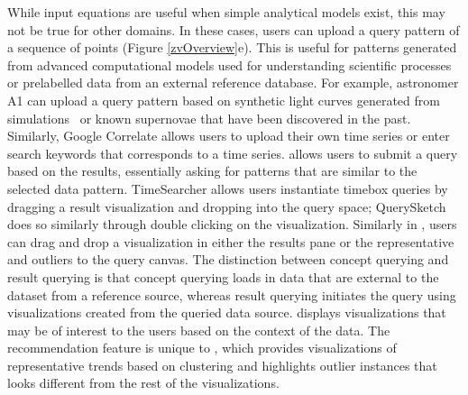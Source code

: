 While input equations are useful when simple analytical models exist, this may not be true for other domains. In these cases, users can upload a query pattern of a sequence of points (Figure \ref{zvOverview}e). This is useful for patterns generated from advanced computational models used for understanding scientific processes or prelabelled data from an external reference database. For example, astronomer A1 can upload a query pattern based on synthetic light curves generated from simulations~\cite{Nugent1997} or known supernovae that have been discovered in the past. Similarly, Google Correlate allows users to upload their own time series or enter search keywords that corresponds to a time series.
 allows users to submit a query based on the results, essentially asking for patterns that are similar to the selected data pattern. TimeSearcher allows users instantiate timebox queries by dragging a result visualization and dropping into the query space; QuerySketch does so similarly through double clicking on the visualization. Similarly in \zv, users can drag and drop a visualization in either the results pane or the representative and outliers to the query canvas. The distinction between concept querying and result querying is that concept querying loads in data that are external to the dataset from a reference source, whereas result querying initiates the query using visualizations created from the queried data source.
 displays visualizations that may be of interest to the users based on the context of the data. The recommendation feature is unique to \zv, which provides visualizations of representative trends based on clustering and highlights outlier instances that looks different from the rest of the visualizations.
